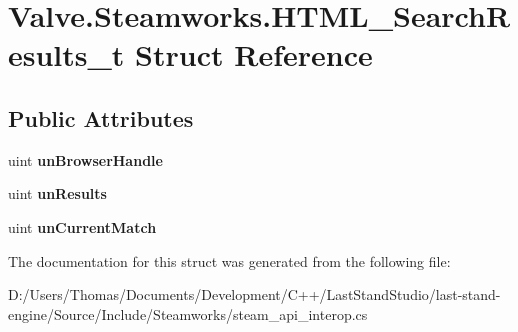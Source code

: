 \hypertarget{structValve_1_1Steamworks_1_1HTML__SearchResults__t}{}\section{Valve.\+Steamworks.\+H\+T\+M\+L\+\_\+\+Search\+Results\+\_\+t Struct Reference}
\label{structValve_1_1Steamworks_1_1HTML__SearchResults__t}
\subsection*{Public Attributes}
\begin{DoxyCompactItemize}
\item 
\hypertarget{structValve_1_1Steamworks_1_1HTML__SearchResults__t_a734d74e2429574118173bdd3381901ad}{}uint {\bfseries un\+Browser\+Handle}\label{structValve_1_1Steamworks_1_1HTML__SearchResults__t_a734d74e2429574118173bdd3381901ad}

\item 
\hypertarget{structValve_1_1Steamworks_1_1HTML__SearchResults__t_a3b367341041e2b1014a4ce43e2a52130}{}uint {\bfseries un\+Results}\label{structValve_1_1Steamworks_1_1HTML__SearchResults__t_a3b367341041e2b1014a4ce43e2a52130}

\item 
\hypertarget{structValve_1_1Steamworks_1_1HTML__SearchResults__t_af27e10a4212e45919cf622c2564fc309}{}uint {\bfseries un\+Current\+Match}\label{structValve_1_1Steamworks_1_1HTML__SearchResults__t_af27e10a4212e45919cf622c2564fc309}

\end{DoxyCompactItemize}


The documentation for this struct was generated from the following file\+:\begin{DoxyCompactItemize}
\item 
D\+:/\+Users/\+Thomas/\+Documents/\+Development/\+C++/\+Last\+Stand\+Studio/last-\/stand-\/engine/\+Source/\+Include/\+Steamworks/steam\+\_\+api\+\_\+interop.\+cs\end{DoxyCompactItemize}
